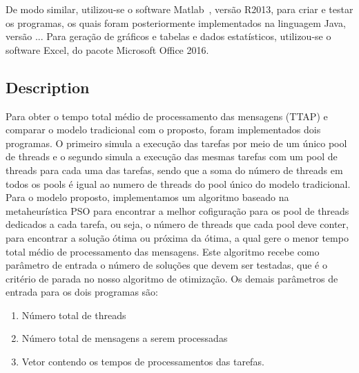 De modo similar, utilizou-se o software Matlab~\cite{leonard1995}, versão R2013, para criar e testar os programas, os quais foram posteriormente implementados na linguagem Java, versão ...
Para geração de gráficos e tabelas e dados estatísticos, utilizou-se o software Excel, do pacote Microsoft Office 2016.
\subsection{Description}
\label{subsec:description}
Para obter o tempo total médio de processamento das mensagens (TTAP) e comparar o modelo tradicional com o proposto, foram implementados dois programas. O primeiro simula a execução das tarefas por meio de um único pool de threads e o segundo simula a execução das mesmas tarefas com um pool de threads para cada uma das tarefas, sendo que a soma do número de threads em todos os pools é igual ao numero de threads do pool único do modelo tradicional. Para o modelo proposto, implementamos um algoritmo baseado na metaheurística PSO para encontrar a melhor cofiguração para os pool de threads dedicados a cada tarefa, ou seja, o número de threads que cada pool deve conter, para encontrar a solução ótima ou próxima da ótima, a qual gere o menor tempo total médio de processamento das mensagens. Este algoritmo recebe como parâmetro de entrada o número de soluções que devem ser testadas, que é o critério de parada no nosso algoritmo de otimização. Os demais parâmetros de entrada para os dois programas são:
\begin{enumerate}
                 \item Número total de threads
                 \item Número total de mensagens a serem processadas
                 \item Vetor contendo os tempos de processamentos das tarefas. 
\end{enumerate}
